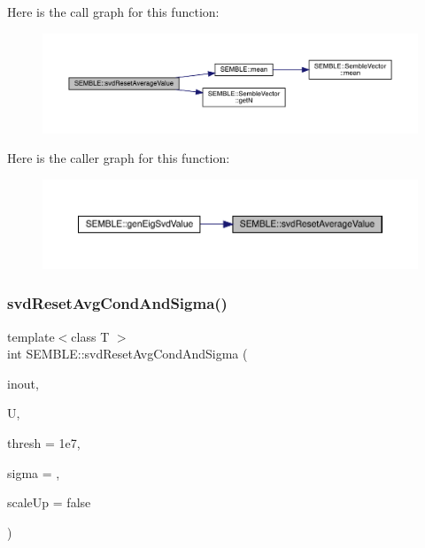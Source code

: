 Here is the call graph for this function\+:
\nopagebreak
\begin{figure}[H]
\begin{center}
\leavevmode
\includegraphics[width=350pt]{d7/dfd/namespaceSEMBLE_a5a99b05753b531606137646e96ee12ff_cgraph}
\end{center}
\end{figure}
Here is the caller graph for this function\+:
\nopagebreak
\begin{figure}[H]
\begin{center}
\leavevmode
\includegraphics[width=350pt]{d7/dfd/namespaceSEMBLE_a5a99b05753b531606137646e96ee12ff_icgraph}
\end{center}
\end{figure}
\mbox{\label{namespaceSEMBLE_a14b6eda564f38c74c1fff912f2747138}} 
\subsubsection{\texorpdfstring{svdResetAvgCondAndSigma()}{svdResetAvgCondAndSigma()}}
{\footnotesize\ttfamily template$<$class T $>$ \\
int S\+E\+M\+B\+L\+E\+::svd\+Reset\+Avg\+Cond\+And\+Sigma (\begin{DoxyParamCaption}\item[{\mbox{\hyperlink{structSEMBLE_1_1SembleVector}{Semble\+Vector}}$<$ double $>$ \&}]{inout,  }\item[{\mbox{\hyperlink{structSEMBLE_1_1SembleMatrix}{Semble\+Matrix}}$<$ T $>$ \&}]{U,  }\item[{const double}]{thresh = {\ttfamily 1e7},  }\item[{const double}]{sigma = {},  }\item[{const bool}]{scale\+Up = {\ttfamily false} }\end{DoxyParamCaption})}

